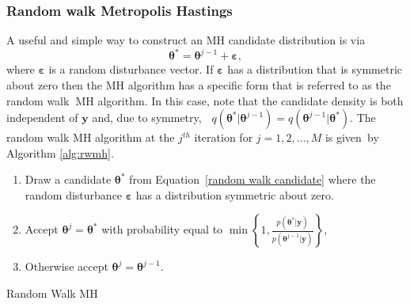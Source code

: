\documentclass[article]{jss}
\begin{document}
\subsubsection{Random walk Metropolis Hastings}


A useful and simple way to construct an MH candidate distribution is
via\begin{equation}
  \bm{\theta}^{\ast}=\bm{\theta}^{j-1}+\bm{\bm{\varepsilon}},\label{random
    walk candidate}\end{equation} where $\bm{\varepsilon}$ is a random
disturbance vector. If $\bm{\varepsilon}$ has a distribution that is
symmetric about zero then the MH algorithm has a specific form that is
referred to as the random walk\textbf{\ }MH algorithm. In this case,
note that the candidate density is both independent of $\bm{y}$ and,
due to symmetry, \textbf{\
}$q\left(\bm{\theta}^{\ast}|\bm{\theta}^{j-1}\right)=q\left(\bm{\theta}^{j-1}|\bm{\theta}^{\ast}\right)$.
The random walk MH algorithm at the $j^{th}$ iteration for
$j=1,2,\ldots,M$ is given\emph{\ }by Algorithm \ref{alg:rwmh}.

%
\begin{algorithm}[H]
  \begin{enumerate}
  \item Draw a candidate $\bm{\theta}^{\ast}$ from
    Equation~\ref{random walk candidate} where the random disturbance
    $\bm{\varepsilon}$ has a distribution symmetric about zero.
  \item Accept $\bm{\theta}^{j}=\bm{\theta}^{\ast}$ with probability
    equal to $\min\left\{
      1,\frac{p\left(\bm{\theta}^{\ast}|\bm{y}\right)}{p\left(\bm{\theta}^{j-1}|\bm{y}\right)}\right\}
    $,
  \item Otherwise accept $\bm{\theta}^{j}=\bm{\theta}^{j-1}.$
  \end{enumerate}
  \caption{Random Walk MH}
\label{alg:rwmh}
\end{algorithm}
\end{document}
